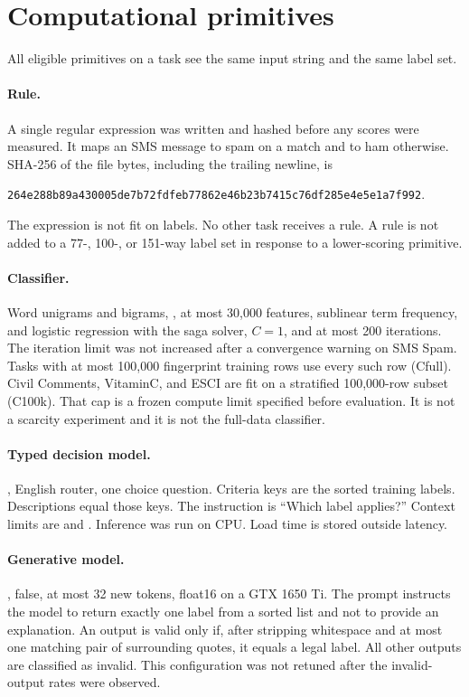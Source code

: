 \section{Computational primitives}
\label{sec:primitives}

All eligible primitives on a task see the same input string and the same label set.

\paragraph{Rule.}
A single regular expression was written and hashed before any scores were measured. It maps an SMS message to spam on a match and to ham otherwise. SHA-256 of the file bytes, including the trailing newline, is
\begin{center}
\texttt{264e288b89a430005de7b72fdfeb77862e46b23b7415c76df285e4e5e1a7f992}.
\end{center} The expression is not fit on labels. No other task receives a rule. A rule is not added to a 77-, 100-, or 151-way label set in response to a lower-scoring primitive.

\paragraph{Classifier.}
Word unigrams and bigrams, , at most 30{,}000 features, sublinear term frequency, and logistic regression with the saga solver, \(C=1\), and at most 200 iterations. The iteration limit was not increased after a convergence warning on SMS Spam. Tasks with at most 100{,}000 fingerprint training rows use every such row (Cfull). Civil Comments, VitaminC, and ESCI are fit on a stratified 100{,}000-row subset (C100k). That cap is a frozen compute limit specified before evaluation. It is not a scarcity experiment and it is not the full-data classifier.

\paragraph{Typed decision model.}
, English router, one choice question. Criteria keys are the sorted training labels. Descriptions equal those keys. The instruction is ``Which label applies?'' Context limits are  and . Inference was run on CPU. Load time is stored outside latency.

\paragraph{Generative model.}
,  false, at most 32 new tokens, float16 on a GTX 1650 Ti. The prompt instructs the model to return exactly one label from a sorted list and not to provide an explanation. An output is valid only if, after stripping whitespace and at most one matching pair of surrounding quotes, it equals a legal label. All other outputs are classified as invalid. This configuration was not retuned after the invalid-output rates were observed.

